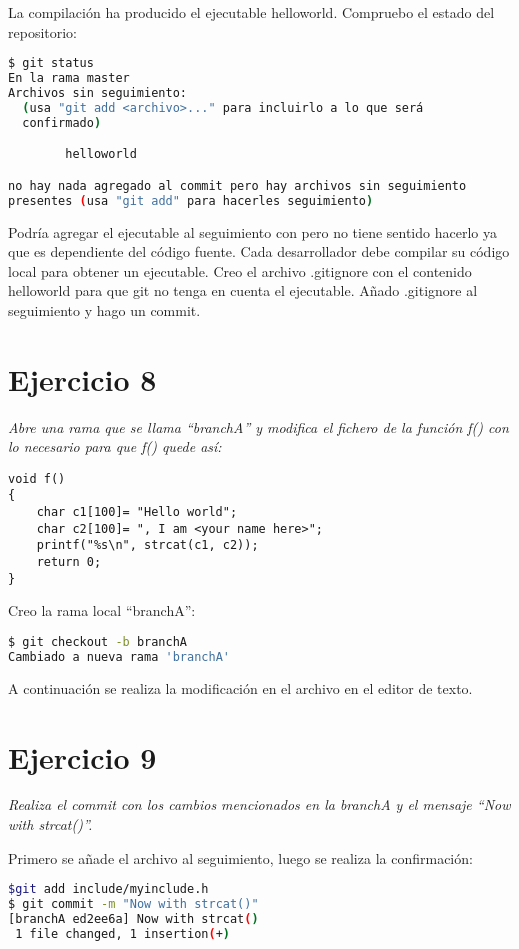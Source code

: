 La compilación ha producido el ejecutable helloworld. Compruebo el estado del repositorio:

\begin{lstlisting}[basicstyle=\small,xrightmargin=.10\textwidth,xleftmargin=.10\textwidth,language=bash]
$ git status
En la rama master
Archivos sin seguimiento:
  (usa "git add <archivo>..." para incluirlo a lo que será
  confirmado)

        helloworld

no hay nada agregado al commit pero hay archivos sin seguimiento
presentes (usa "git add" para hacerles seguimiento)
\end{lstlisting}

Podría agregar el ejecutable al seguimiento con  pero no tiene sentido hacerlo ya que es dependiente del código fuente. Cada desarrollador debe compilar su código local para obtener un ejecutable.
Creo el archivo .gitignore con el contenido helloworld para que git no tenga en cuenta el ejecutable. Añado .gitignore al seguimiento y hago un commit.

\section{Ejercicio 8}
\begin{center}
    \parbox{12cm}{\justify\textit{
        Abre una rama que se llama ``branchA'' y modifica el fichero de la función f() con lo necesario para que f() quede así:
    }}
\begin{lstlisting}[style=CStyle,xleftmargin=.3\textwidth]
void f()
{
    char c1[100]= "Hello world";
    char c2[100]= ", I am <your name here>";
    printf("%s\n", strcat(c1, c2));
    return 0;
}\end{lstlisting}
\end{center}

Creo la rama local ``branchA'':
\begin{lstlisting}[basicstyle=\small,xrightmargin=.10\textwidth,xleftmargin=.10\textwidth,language=bash]
$ git checkout -b branchA
Cambiado a nueva rama 'branchA'
\end{lstlisting}
A continuación se realiza la modificación en el archivo en el editor de texto.

\section{Ejercicio 9}
\begin{center}
    \parbox{12cm}{\justify\textit{
        Realiza el commit con los cambios mencionados en la branchA y el mensaje ``Now with strcat()''.
    }}
\end{center}
Primero se añade el archivo al seguimiento, luego se realiza la confirmación:
\begin{lstlisting}[basicstyle=\small,xrightmargin=.10\textwidth,xleftmargin=.10\textwidth,language=bash]
$git add include/myinclude.h
$ git commit -m "Now with strcat()"
[branchA ed2ee6a] Now with strcat()
 1 file changed, 1 insertion(+)
\end{lstlisting}

